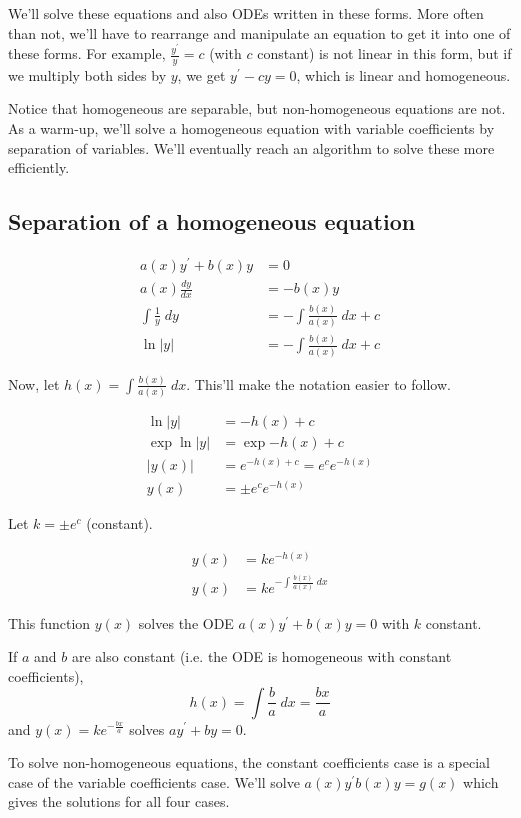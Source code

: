 \documentclass[11pt]{article}
\newcommand{\fdx}{\frac{dy}{dx}} %
\newcommand{\yp}{y^{\prime}}
\begin{document}
	We'll solve these equations and also ODEs written in these forms. More often than not, we'll have to rearrange and manipulate an equation to get it into one of these forms. For example, $\frac{\yp}{y} = c$ (with $c$ constant) is not linear in this form, but if we multiply both sides by $y$, we get $\yp - cy = 0$, which is linear and homogeneous.

	Notice that homogeneous are separable, but non-homogeneous equations are not. As a warm-up, we'll solve a homogeneous equation with variable coefficients by separation of variables. We'll eventually reach an algorithm to solve these more efficiently.

\subsection{Separation of a homogeneous equation}
	\begin{align*}
		a(x)\yp + b(x)y &= 0 \\
		a(x)\fdx &= -b(x) y \\
		\int \frac{1}{y} \; dy &= - \int \frac{b(x)}{a(x)} \; dx + c \\
		\ln{|y|} &= - \int \frac{b(x)}{a(x)} \; dx + c
	\end{align*}

	Now, let $h(x) = \int \frac{b(x)}{a(x)} \; dx$. This'll make the notation easier to follow.

	\begin{align*}
		\ln{|y|} &= - h(x) + c \\
		\exp{\ln{|y|}} &= \exp{- h(x) + c} \\
		|y(x)| &= e^{-h(x) + c} = e^c e^{-h(x)} \\
		y(x) &= \pm e^c e^{-h(x)}
	\end{align*}

	Let $k = \pm e^c$ (constant).

	\begin{align*}
		y(x) &= k e^{-h(x)} \\
		y(x) &= k e^{- \int \frac{b(x)}{a(x)} \; dx}
	\end{align*}

	This function $y(x)$ solves the ODE $a(x)\yp + b(x)y = 0$ with $k$ constant.

	If $a$ and $b$ are also constant (i.e. the ODE is homogeneous with constant coefficients),
		$$ h(x) = \int \frac{b}{a} \; dx = \frac{bx}{a} $$
	and $y(x) = k e^{- \frac{bx}{a}}$ solves $a\yp + by = 0$.

	To solve non-homogeneous equations, the constant coefficients case is a special case of the variable coefficients case. We'll solve $a(x)\yp b(x)y = g(x)$ which gives the solutions for all four cases.
\end{document}
